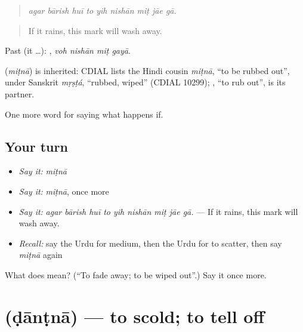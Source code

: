 \begin{quote}
        
\end{quote}

\begin{quote}
\emph{agar bārish huī to yih nishān miṭ jāe gā.}
\end{quote}

\begin{quote}
If it rains, this mark will wash away.
\end{quote}

Past (it …):    , \emph{voh nishān miṭ gayā}.

\begin{cousinweb}
\textbf{} (\emph{miṭnā}) is inherited: CDIAL lists the Hindi cousin \emph{miṭnā}, \textquotedblleft{}to be rubbed out\textquotedblright{}, under Sanskrit \emph{mṛṣṭá}, \textquotedblleft{}rubbed, wiped\textquotedblright{} (CDIAL 10299); \textbf{}, \textquotedblleft{}to rub out\textquotedblright{}, is its partner.
\end{cousinweb}

\begin{grammarlens}[title={What you've built}]
One more word for saying what happens if.
\end{grammarlens}

\subsection*{Your turn}
\begin{itemize}
\raggedright
  \item \emph{Say it:} \emph{miṭnā}
  \item \emph{Say it:} \emph{miṭnā}, once more
  \item \emph{Say it:} \emph{agar bārish huī to yih nishān miṭ jāe gā.} — If it rains, this mark will wash away.
  \item \emph{Recall:} say the Urdu for medium, then the Urdu for to scatter, then say \emph{miṭnā} again
\end{itemize}

\begin{tcolorbox}[breakable,colback=teal!4,colframe=teal!35!black,title={Before you move on}]
What does  mean? (\textquotedblleft{}To fade away; to be wiped out\textquotedblright{}.) Say it once more.
\end{tcolorbox}
\section[\texorpdfstring{\ur{ڈانٹنا} (ḍānṭnā)}{ڈانٹنا (ḍānṭnā)}]{ (ḍānṭnā) — to scold; to tell off}

